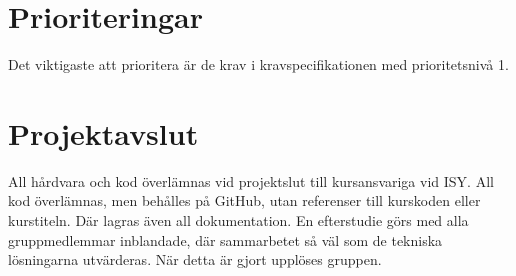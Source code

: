 \documentclass[a4paper,titlepage,12pt]{article}
\begin{document}
	\section{Prioriteringar}
    Det viktigaste att prioritera är de krav i kravspecifikationen med
    prioritetsnivå 1.
	
	
	\section{Projektavslut}
	All hårdvara och kod överlämnas vid projektslut till kursansvariga vid ISY. All 
	kod överlämnas, men behålles på GitHub, utan referenser till kurskoden eller 
	kurstiteln. Där lagras även all dokumentation. En efterstudie görs med alla 
	gruppmedlemmar inblandade, där sammarbetet så väl som de tekniska lösningarna 
	utvärderas. När detta är gjort upplöses gruppen.
\end{document}
